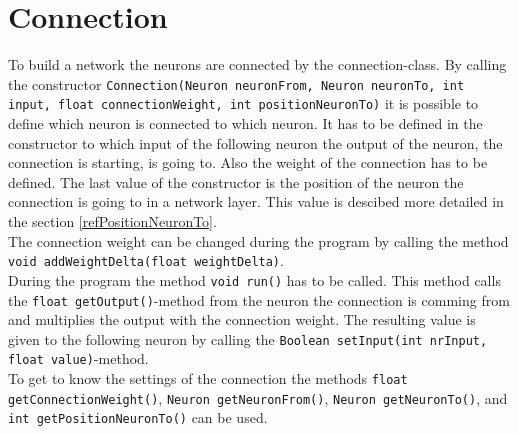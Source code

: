 \section{Connection}
To build a network the neurons are connected by the connection-class. By calling the constructor \texttt{Connection(Neuron neuronFrom, Neuron neuronTo, int input, float connectionWeight, int positionNeuronTo)} it is possible to define which neuron is connected to which neuron. It has to be defined in the constructor to which input of the following neuron the output of the neuron, the connection is starting, is going to. Also the weight of the connection has to be defined. The last value of the constructor is the position of the neuron the connection is going to in a network layer. This value is descibed more detailed in the section \ref{refPositionNeuronTo}.\\
The connection weight can be changed during the program by calling the method \texttt{void addWeightDelta(float weightDelta)}.\\
During the program the method \texttt{void run()} has to be called. This method calls the \texttt{float getOutput()}-method from the neuron the connection is comming from and multiplies the output with the connection weight. The resulting value is given to the following neuron by calling the \texttt{Boolean setInput(int nrInput, float value)}-method.\\
To get to know the settings of the connection the methods \texttt{float getConnectionWeight()}, \texttt{Neuron getNeuronFrom()}, \texttt{Neuron getNeuronTo()}, and \texttt{int getPositionNeuronTo()} can be used.